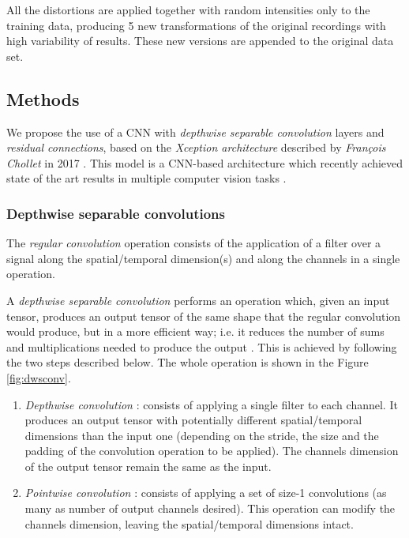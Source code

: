 \documentclass[review]{elsarticle}
\begin{document}
All the distortions are applied together with random intensities only to the training data, producing 5 new transformations of the original recordings with high variability of results. These new versions are appended to the original data set.


\subsection{Methods}
We propose the use of a CNN with \textit{depthwise separable convolution} layers and \textit{residual connections}, based on the \textit{Xception architecture}  described by \textit{François Chollet} in 2017 \cite{FChollet2017}. This model is a CNN-based architecture which recently achieved state of the art results in multiple computer vision tasks \cite{Liu2019, Nazar2018, Song2018, Arriaga2017}. 

\subsubsection{Depthwise separable convolutions}
The \textit{regular convolution} operation consists of the application of a filter over a signal along the spatial/temporal dimension(s) and along the channels in a single operation. 

A \textit{depthwise separable convolution} performs an operation which, given an input tensor, produces an output tensor of the same shape that the regular convolution would produce, but in a more efficient way; i.e. it reduces the number of sums and multiplications needed to produce the output \cite{FChollet2017}. This is achieved by following the two steps described below. The whole operation is shown in the Figure \ref{fig:dwsconv}.



\begin{enumerate}
	\item \textit{Depthwise convolution} \cite{Yunhui2019}: consists of applying a single filter to each channel. It produces an output tensor with potentially different spatial/temporal dimensions than the input one (depending on the stride, the size and the padding of the convolution operation to be applied). The channels dimension of the output tensor remain the same as the input.
	\item \textit{Pointwise convolution} \cite{Gao2018}: consists of applying a set of size-1 convolutions (as many as number of output channels desired). This operation can modify the channels dimension, leaving the spatial/temporal dimensions intact.
\end{enumerate}
\end{document}
